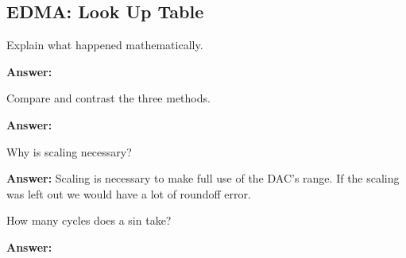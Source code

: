\documentclass{article}
\begin{document}
\subsection{EDMA: Look Up Table}

\begin{enumerate}
  \begin{item}
    Explain what happened mathematically.

  \textbf{Answer:}

  \end{item}

  \begin{item}
    Compare and contrast the three methods.

  \textbf{Answer:}

  \end{item}

  \begin{item}
    Why is scaling necessary?

  \textbf{Answer:}
    Scaling is necessary to make full use of the DAC's range.
    If the scaling was left out we would have a lot of roundoff error.

  \end{item}

  \begin{item}
    How many cycles does a sin take?

  \textbf{Answer:}

  \end{item}
\end{enumerate}





\end{document}
